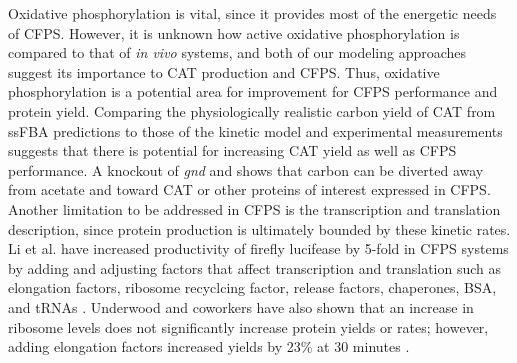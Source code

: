 \documentclass[12pt]{article}
\begin{document}
Oxidative phosphorylation is vital, since it provides most of the energetic needs of CFPS.
However, it is unknown how active oxidative phosphorylation is compared to that of \textit{in vivo} systems, and both of our modeling approaches suggest its importance to CAT production and CFPS.
Thus, oxidative phosphorylation is a potential area for improvement for CFPS performance and protein yield.
Comparing the physiologically realistic carbon yield of CAT from ssFBA predictions to those of the kinetic model and experimental measurements suggests that there is potential for increasing CAT yield as well as CFPS performance.
A knockout of \textit{gnd} and shows that carbon can be diverted away from acetate and toward CAT or other proteins of interest expressed in CFPS.
Another limitation to be addressed in CFPS is the transcription and translation description, since protein production is ultimately bounded by these kinetic rates.
Li et al. have increased productivity of firefly lucifease by 5-fold in CFPS systems by adding and adjusting factors that affect transcription and translation such as elongation factors, ribosome recyclcing factor, release factors, chaperones, BSA, and tRNAs \cite{2014_li_PlosOne}.
Underwood and coworkers have also shown that an increase in ribosome levels does not significantly increase protein yields or rates; however, adding elongation factors increased yields by 23\% at 30 minutes \cite{2005_underwood_biotech}.
\end{document}
